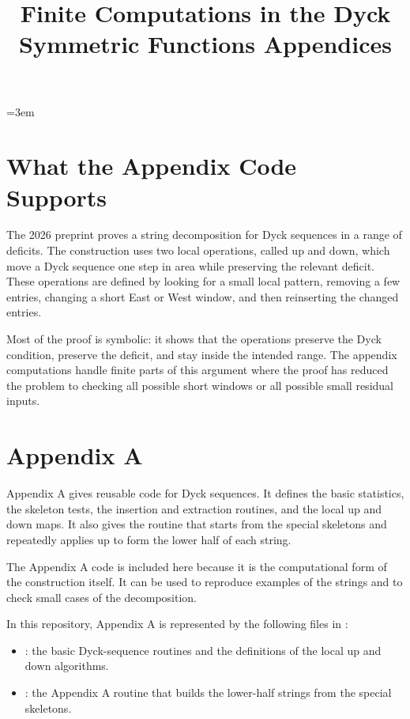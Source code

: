\documentclass{article}
\title{Finite Computations in the Dyck Symmetric Functions Appendices}
\author{}
\date{}
\begin{document}
\emergencystretch=3em
\maketitle

\section{What the Appendix Code Supports}

The 2026 preprint proves a string decomposition for Dyck sequences in a range
of deficits. The construction uses two local operations, called
\(\mathrm{up}\) and \(\mathrm{down}\), which move a Dyck sequence one step in
area while preserving the relevant deficit. These operations are defined by
looking for a small local pattern, removing a few entries, changing a short
East or West window, and then reinserting the changed entries.

Most of the proof is symbolic: it shows that the operations preserve the Dyck
condition, preserve the deficit, and stay inside the intended range. The
appendix computations handle finite parts of this argument where the proof has
reduced the problem to checking all possible short windows or all possible
small residual inputs.

\section{Appendix A}

Appendix A gives reusable code for Dyck sequences. It defines the basic
statistics, the skeleton tests, the insertion and extraction routines, and the
local \(\mathrm{up}\) and \(\mathrm{down}\) maps. It also gives the routine
that starts from the special skeletons and repeatedly applies
\(\mathrm{up}\) to form the lower half of each string.

The Appendix A code is included here because it is the computational form of
the construction itself. It can be used to reproduce examples of the strings
and to check small cases of the decomposition.

In this repository, Appendix A is represented by the following files in
:
\begin{itemize}
\item {}: the
basic Dyck-sequence routines and the definitions of the local
\(\mathrm{up}\) and \(\mathrm{down}\) algorithms.
\item {}: the Appendix A routine
that builds the lower-half strings from the special skeletons.
\end{itemize}
\end{document}
